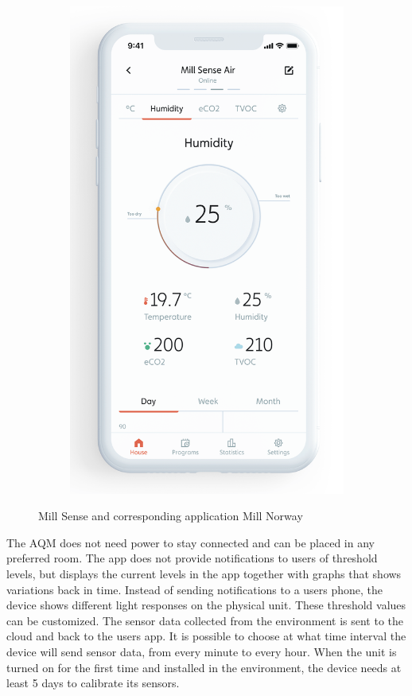 \begin{figure} [H]
\begin{subfigure}{0.3\textwidth}
         \includegraphics[width=1\textwidth]{figures/MillSenseApp.png}
         \label{fig:MillSenseApp}
     \end{subfigure}
     \hfill
        \caption{Mill Sense and corresponding application Mill Norway \cite{MillSense}}
        \label{fig:MillSenseBoth}
\end{figure}

The \gls{AQM} does not need power to stay connected and can be placed in any preferred room. The app does not provide notifications to users of threshold levels, but displays the current levels in the app together with graphs that shows variations back in time. Instead of sending notifications to a users phone, the device shows different light responses on the physical unit. These threshold values can be customized. The sensor data collected from the environment is sent to the cloud and back to the users app. It is possible to choose at what time interval the device will send sensor data, from every minute to every hour. When the unit is turned on for the first time and installed in the environment, the device needs at least 5 days to calibrate its sensors. 

